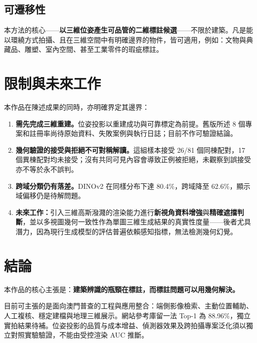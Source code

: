 \documentclass[11pt,a4paper,fontset=windows]{ctexart}
\begin{document}
\subsection{可遷移性}

本方法的核心——\textbf{以三維位姿產生可品管的二維標註候選}——不限於建築。凡是能以環繞方式拍攝、且在三維空間中有明確邊界的物件，皆可適用，例如：文物與典藏品、雕塑、室內空間、甚至工業零件的瑕疵標註。

\section{限制與未來工作}

本作品在陳述成果的同時，亦明確界定其邊界：

\begin{enumerate}[leftmargin=1.5em,itemsep=3pt]
\item \textbf{需先完成三維重建。}位姿投影以重建成功與可靠標定為前提。舊版所述 8 個專案和註冊率尚待原始資料、失敗案例與執行日誌；目前不作可驗證結論。

\item \textbf{幾何驗證的接受與拒絕不可對稱解讀。}這組樣本接受 26/81 個同棟配對，17 個異棟配對均未接受；沒有共同可見內容會導致正例被拒絕，未觀察到誤接受亦不等於永不誤判。

\item \textbf{跨域分類仍有落差。}DINOv2 在同樣分布下達 80.4\%，跨域降至 62.6\%，顯示域偏移仍是待解問題。

\item \textbf{未來工作：}引入三維高斯潑濺的渲染能力進行\textbf{新視角資料增強}與\textbf{精確遮擋判斷}，並以多視圖幾何一致性作為單圖三維生成結果的真實性度量——後者尤具潛力，因為現行生成模型的評估普遍依賴感知指標，無法檢測幾何幻覺。
\end{enumerate}

\section{結論}

本作品的核心主張是：\textbf{建築辨識的瓶頸在標註，而標註問題可以用幾何解決。}

目前可主張的是面向澳門普查的工程與應用整合：端側影像檢索、主動位置輔助、人工複核、穩定建檔與地理三維展示。網站參考庫留一法 Top-1 為 88.96\%，獨立實拍結果待補。位姿投影的品質与成本增益、偵測器效果及跨拍攝專案泛化須以獨立對照實驗驗證，不能由受控渲染 AUC 推斷。
\end{document}
